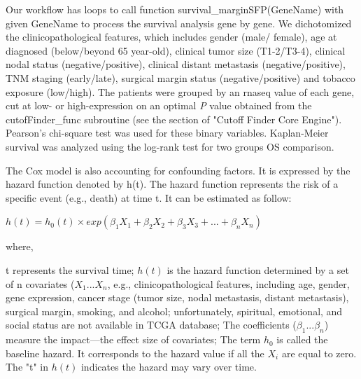 \documentclass[jpm,article,submit,moreauthors,pdftex]{Definitions/mdpi}
\newenvironment{MyColorPar}[1]{%
    \leavevmode\color{#1}\ignorespaces%
}{%
}%
\begin{document}
\begin{paracol}{2}
Our workflow has loops to call function survival\_marginSFP(GeneName) with given GeneName to process the survival analysis gene by gene.
We dichotomized the clinicopathological features, which includes gender (male/ female), age at diagnosed (below/beyond 65 year-old), clinical tumor size (T1-2/T3-4), clinical nodal status (negative/positive), clinical distant metastasis (negative/positive), TNM staging (early/late), surgical margin status (negative/positive) and tobacco exposure (low/high). The patients were grouped by an \acrshort{rnaseq} value of each gene, cut at low- or high-expression on an optimal \textit{P} value obtained from the cutofFinder\_func subroutine (see the section of "Cutoff Finder Core Engine"). Pearson's chi-square test was used for these binary variables. Kaplan-Meier survival was analyzed using the log-rank test for two groups OS comparison.

\begin{MyColorPar}{red}
The Cox model is also accounting for confounding factors\cite{Magen2019}.
It is expressed by the hazard function denoted by h(t). 
The hazard function represents the risk of a specific event (e.g., death) at time t. It can be estimated as follow:

\begin{flushleft}

$h(t) = h_0(t) \times exp(\beta_1 X_1 + \beta_2 X_2 + \beta_3 X_3 + ... + \beta_n X_n)$\\[0.3cm]
\end{flushleft}
where,\\
\begin{outline} %
\1 t represents the survival time;
\1 $h(t)$ is the hazard function determined by a set of n covariates ($X_1...X_n$, e.g., clinicopathological features, including age, gender, gene expression, cancer stage (tumor size, nodal metastasis, distant metastasis), surgical margin, smoking, and alcohol; unfortunately, spiritual, emotional, and social status are not available in TCGA database;
\1 The coefficients ($\beta_1...\beta_n$) measure the impact---the effect size of covariates;
\1 The term $h_0$ is called the baseline hazard. It corresponds to the hazard value if all the $X_i$ are equal to zero. The "t" in $h(t)$ indicates the hazard may vary over time.
\end{outline}


\end{MyColorPar}
\end{paracol}
\end{document}
